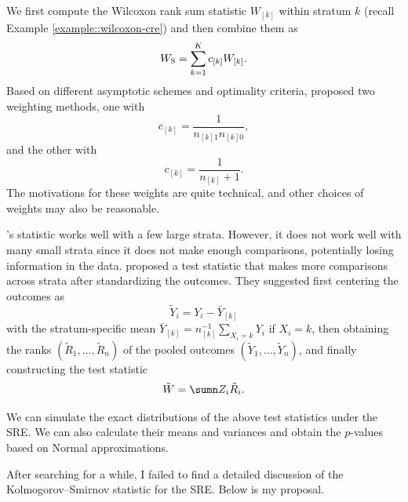 \begin{example}
\label{eg::vanelteren}
We first compute the Wilcoxon rank sum statistic $W_{[k]}$ within stratum $k$ (recall Example \ref{example::wilcoxon-cre}) and then combine them as
$$
W_\textsc{S} = \sum_{k=1}^K   c_{[k]}  W_{[k]}   . 
$$
Based on different asymptotic schemes and optimality criteria, \citet{van1960combination} proposed two weighting methods, one with
$$
c_{[k]}  = \frac{1}{  n_{[k]1}  n_{[k]0} },
$$
and the other with 
$$ 
c_{[k]}  = \frac{1}{  n_{[k]}  +1 } .
$$
The motivations for these weights are quite technical, and other choices of weights may also be reasonable. 
\end{example}


 


\begin{example}
\label{eg::hodgeslehmann}
\citet{van1960combination}'s statistic works well with a few large strata. However, it does not work well with many small strata since it does not make enough comparisons, potentially losing information in the data.  \citet{hodges1962rank} proposed a test statistic that makes more comparisons across strata after standardizing the outcomes. They suggested first centering the outcomes as
$$
\tilde{Y}_i = Y_i  - \bar{Y}_{[k]}
$$
with the stratum-specific mean
$
\bar{Y}_{[k]} = n_{[k]}^{-1} \sum_{X_i   = k} Y_i
$
if $X_i = k$, 
then obtaining the ranks $(\tilde{R}_1, \ldots, \tilde{R}_n)$ of the pooled outcomes $(\tilde{Y}_1, \ldots, \tilde{Y}_n)$, and finally constructing the test statistic 
$$
\tilde{W} = \sumn Z_i \tilde{R}_i.
$$
\end{example}


We can simulate the exact distributions of the above test statistics under the SRE. We can also calculate their means and variances and obtain the $p$-values based on Normal approximations. 


After searching for a while,  I failed to find a detailed discussion of the Kolmogorov--Smirnov statistic for the SRE. Below is my proposal.


